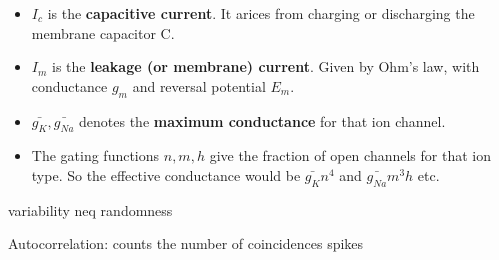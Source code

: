 \documentclass{tufte-handout}
\makeatletter
\renewcommand{\section}{\@startsection{section}%
    {3}{-1.01em}{-3ex \@plus -1ex \@minus -.2ex}%
    {1.5ex \@plus .2ex}
    {\hspace*{-5.5em}\fcolorbox{blue}{blue}{\parbox[c][1.0ex][b]{4em}{\phantom{space}}}
    \normalfont\Large\itshape\color{blue}}}
\makeatother
\begin{document}
\begin{itemize}
  \item \( I_c \) is the \textbf{capacitive current}. It arices from charging or discharging the
membrane capacitor C.
  \item \( I_m \) is the \textbf{leakage (or membrane) current}.
  Given by Ohm's law, with conductance \( g_m \) and reversal potential \( E_m \).
  
  \item \( \bar{g_K}, \bar{g_{Na}} \) denotes the \textbf{maximum
  conductance} for that ion channel.
  
  \item The gating functions \( n,m,h \) give the fraction of open channels for that ion type.
  So the effective conductance would be \( \bar{g_K}n^4 \) and \( \bar{g_{Na}}m^3h \) etc.
\end{itemize}


variability neq randomness

Autocorrelation:
counts the number of coincidences spikes 


\makeatletter
  \renewcommand{\section}{\@startsection{section}%
    {3}{0.8em}{-3ex \@plus -1ex \@minus -.2ex}%
    {1.5ex \@plus .2ex}
    {\hspace*{-5.5em}\fcolorbox{Periwinkle}{Periwinkle}{\parbox[c][1.0ex][b]{4em}{\phantom{space}}}
    \normalfont\Large\itshape\color{blue}}}
\makeatother



\end{document}
